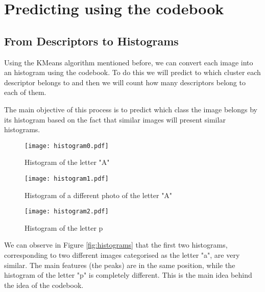 \documentclass[9pt,a4paper,twoside]{tau-class/tau}
\begin{document}
\section{Predicting using the codebook}

    \subsection{From Descriptors to Histograms}
        Using the KMeans algorithm mentioned before, we can convert each image into an histogram using the codebook.
        To do this we will predict to which cluster each descriptor belongs to and then we will count how many descriptors 
        belong to each of them.

        The main objective of this process is to predict which class the image belongs by its histogram based on the fact that similar images will
        present similar histograms.

        \begin{figure*}[t] %
            \centering
            \begin{subfigure}[b]{0.2\linewidth} %
                \texttt{[image: histogram0.pdf]} %
                \caption{Histogram of the letter "A"}
                \label{fig:hista}
            \end{subfigure}
                \hspace{20pt}   %
            \begin{subfigure}[b]{0.2\linewidth} %
                \texttt{[image: histogram1.pdf]}
                \caption{Histogram of a different photo of the letter "A"}
                \label{fig:histb}
            \end{subfigure}
                \hspace{20pt} 
            \begin{subfigure}[b]{0.2\linewidth} %
                \texttt{[image: histogram2.pdf]}
                \caption{Histogram of the letter p}
                \label{fig:histc}            
            \end{subfigure}
            \caption{Comparison of histograms of different images}
            \label{fig:histograms}
        \end{figure*}
		
	We can observe in Figure \ref{fig:histograms} that the first two histograms, corresponding to two different images categorised as the letter "a", are very similar.
    The main features (the peaks) are in the same position, while the histogram of the letter "p" is completely different. This is the main idea behind the idea of the codebook.
    
\end{document}
